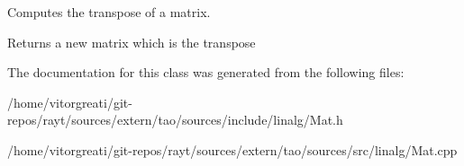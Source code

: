 Computes the transpose of a matrix. 

\begin{DoxyReturn}{Returns}
a new matrix which is the transpose 
\end{DoxyReturn}


The documentation for this class was generated from the following files\+:\begin{DoxyCompactItemize}
\item 
/home/vitorgreati/git-\/repos/rayt/sources/extern/tao/sources/include/linalg/Mat.\+h\item 
/home/vitorgreati/git-\/repos/rayt/sources/extern/tao/sources/src/linalg/Mat.\+cpp\end{DoxyCompactItemize}
